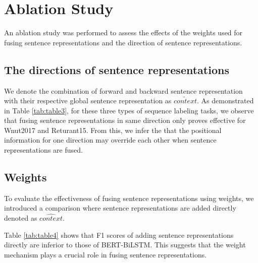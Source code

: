\documentclass[lettersize,journal]{IEEEtran}
\begin{document}
 \begin{table*}[]
\centering
{}
\caption{Experiments on adding global context mechanism directly. \label{tab:table7}}
\end{table*}



\section{Ablation Study}
An ablation study was performed to assess the effects of the weights used for fusing sentence representations and the direction of sentence representations.
\subsection{The directions of sentence representations}

We denote the combination of forward and backward sentence representation with their respective global sentence representation as $\tilde{context}$. As demonstrated in Table \ref{tab:table3}, for these three types of sequence labeling tasks, we observe that fusing sentence representations in same direction only proves effective for Wnut2017 and Returant15. From this, we infer the that the positional information for one direction may override each other when sentence representations are fused.
\subsection{Weights}
To evaluate the effectiveness of fusing sentence representations using weights, we introduced a comparison where sentence representations are added directly denoted as $\hat{context}$.


Table \ref{tab:table4} shows that F1 scores of adding sentence representations directly are inferior to those of BERT-BiLSTM. This suggests that the weight mechanism plays a crucial role in fusing sentence representations.
\end{document}
